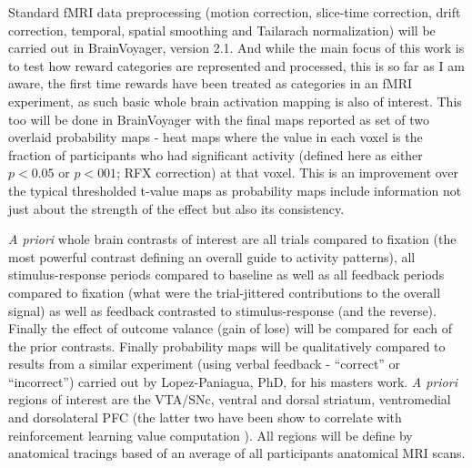 \documentclass[doc,12pt]{apa}        %
\begin{document}
Standard fMRI data preprocessing (motion correction, slice-time correction, drift correction, temporal, spatial smoothing and Tailarach normalization) will be carried out in BrainVoyager, version 2.1.  And while the main focus of this work is to test how reward categories are represented and processed, this is so far as I am aware, the first time rewards have been treated as categories in an fMRI experiment, as such basic whole brain activation mapping is also of interest.  This too will be done in BrainVoyager with the final maps reported as set of two overlaid probability maps - heat maps where the value in each voxel is the fraction of participants who had significant activity (defined here as either $p < 0.05$ or $p < 001$; RFX correction) at that voxel.   This is an improvement over the typical thresholded t-value maps as probability maps include information not just about the strength of the effect but also its consistency.  

\emph{A priori} whole brain contrasts of interest are all trials compared to fixation (the most powerful contrast defining an overall guide to activity patterns), all stimulus-response periods compared to baseline as well as all feedback periods compared to fixation (what were the trial-jittered contributions to the overall signal) as well as feedback contrasted to stimulus-response (and the reverse).   Finally the effect of outcome valance (gain of lose) will be compared for each of the prior contrasts.  Finally probability maps will be qualitatively compared to results from a similar experiment (using verbal feedback - ``correct'' or ``incorrect'') carried out by Lopez-Paniagua, PhD, for his masters work. \emph{A priori} regions of interest are the VTA/SNc, ventral and dorsal striatum, ventromedial and dorsolateral PFC (the latter two have been show to correlate with reinforcement learning value computation ).  All regions will be define by anatomical tracings based of an average of all participants anatomical MRI scans.
\end{document}
